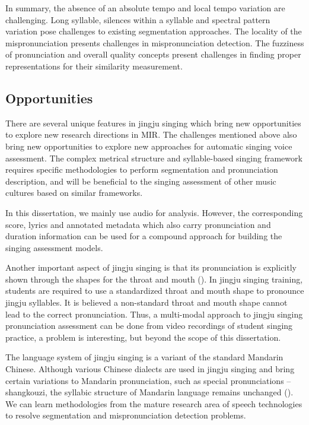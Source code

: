 In summary, the absence of an absolute tempo and local tempo variation are challenging. Long syllable, silences within a syllable and spectral pattern variation pose challenges to existing segmentation approaches. The locality of the mispronunciation presents challenges in mispronunciation detection. The fuzziness of pronunciation and overall quality concepts present challenges in finding proper representations for their similarity measurement.

\subsection{Opportunities}

There are several unique features in jingju singing which bring new opportunities to explore new research directions in MIR. The challenges mentioned above also bring new opportunities to explore new approaches for automatic singing voice assessment. The complex metrical structure and syllable-based singing framework requires specific methodologies to perform segmentation and pronunciation description, and will be beneficial to the singing assessment of other music cultures based on similar frameworks.

In this dissertation, we mainly use audio for analysis. However, the corresponding score, lyrics and annotated metadata which also carry pronunciation and duration information can be used for a compound approach for building the singing assessment models.

Another important aspect of jingju singing is that its pronunciation is explicitly shown through the shapes for the throat and mouth (). In jingju singing training, students are required to use a standardized throat and mouth shape to pronounce jingju syllables. It is believed a non-standard throat and mouth shape cannot lead to the correct pronunciation. Thus, a multi-modal approach to jingju singing pronunciation assessment can be done from video recordings of student singing practice, a problem is interesting, but beyond the scope of this dissertation.

The language system of jingju singing is a variant of the standard Mandarin Chinese. Although various Chinese dialects are used in jingju singing and bring certain variations to Mandarin pronunciation, such as special pronunciations -- shangkouzi, the syllabic structure of Mandarin language remains unchanged (). We can learn methodologies from the mature research area of speech technologies to resolve segmentation and mispronunciation detection problems. 

